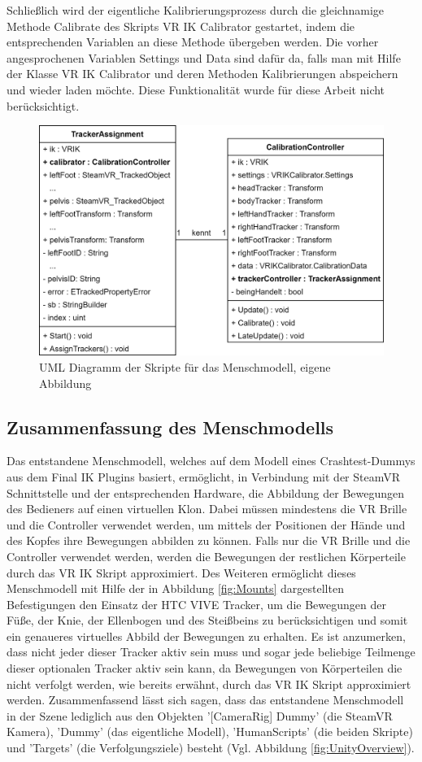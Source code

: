 Schließlich wird der eigentliche Kalibrierungsprozess durch die gleichnamige Methode Calibrate des Skripts VR IK Calibrator gestartet, indem die entsprechenden Variablen an diese Methode übergeben werden. Die vorher angesprochenen Variablen Settings und Data sind dafür da, falls man mit Hilfe der Klasse VR IK Calibrator und deren Methoden Kalibrierungen abspeichern und wieder laden möchte. Diese Funktionalität wurde für diese Arbeit nicht berücksichtigt.
\begin{figure}[h]
	\centering
	\includegraphics[width=0.6\linewidth]{Bilder/A40_MenschUML}
	\caption{UML Diagramm der Skripte für das Menschmodell, eigene Abbildung}
	\label{fig:MenschUML}
\end{figure}

\subsection{Zusammenfassung des Menschmodells}\label{sec:MMFunktionen}
Das entstandene Menschmodell, welches auf dem Modell eines Crashtest-Dummys aus dem Final IK Plugins basiert, ermöglicht, in Verbindung mit der SteamVR Schnittstelle und der entsprechenden Hardware, die Abbildung der Bewegungen des Bedieners auf einen virtuellen Klon. Dabei müssen mindestens die VR Brille und die Controller verwendet werden, um mittels der Positionen der Hände und des Kopfes ihre Bewegungen abbilden zu können. Falls nur die VR Brille und die Controller verwendet werden, werden die Bewegungen der restlichen Körperteile durch das VR IK Skript approximiert. Des Weiteren ermöglicht dieses Menschmodell mit Hilfe der in Abbildung \ref{fig:Mounts} dargestellten Befestigungen den Einsatz der HTC VIVE Tracker, um die Bewegungen der Füße, der Knie, der Ellenbogen und des Steißbeins zu berücksichtigen und somit ein genaueres virtuelles Abbild der Bewegungen zu erhalten. Es ist anzumerken, dass nicht jeder dieser Tracker aktiv sein muss und sogar jede beliebige Teilmenge dieser optionalen Tracker aktiv sein kann, da Bewegungen von Körperteilen die nicht verfolgt werden, wie bereits erwähnt, durch das VR IK Skript approximiert werden.
\newline
Zusammenfassend lässt sich sagen, dass das entstandene Menschmodell in der Szene lediglich aus den Objekten '[CameraRig] Dummy' (die SteamVR Kamera), 'Dummy' (das eigentliche Modell), 'HumanScripts' (die beiden Skripte) und 'Targets' (die Verfolgungsziele) besteht (Vgl. Abbildung \ref{fig:UnityOverview}).

